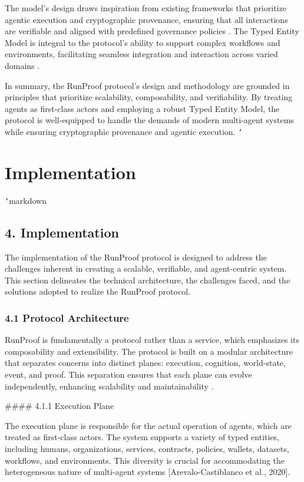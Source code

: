 \documentclass[11pt]{article}
\begin{document}
The model's design draws inspiration from existing frameworks that prioritize agentic execution and cryptographic provenance, ensuring that all interactions are verifiable and aligned with predefined governance policies \cite{Moslemi2026}. The Typed Entity Model is integral to the protocol's ability to support complex workflows and environments, facilitating seamless integration and interaction across varied domains \cite{Li2025}.

In summary, the RunProof protocol's design and methodology are grounded in principles that prioritize scalability, composability, and verifiability. By treating agents as first-class actors and employing a robust Typed Entity Model, the protocol is well-equipped to handle the demands of modern multi-agent systems while ensuring cryptographic provenance and agentic execution.
\texttt{`}


\section{Implementation}
\texttt{`}markdown
\subsection{4. Implementation}

The implementation of the RunProof protocol is designed to address the challenges inherent in creating a scalable, verifiable, and agent-centric system. This section delineates the technical architecture, the challenges faced, and the solutions adopted to realize the RunProof protocol.

\subsubsection{4.1 Protocol Architecture}

RunProof is fundamentally a protocol rather than a service, which emphasizes its composability and extensibility. The protocol is built on a modular architecture that separates concerns into distinct planes: execution, cognition, world-state, event, and proof. This separation ensures that each plane can evolve independently, enhancing scalability and maintainability \cite{Guezouri2010}.

\#\#\#\# 4.1.1 Execution Plane

The execution plane is responsible for the actual operation of agents, which are treated as first-class actors. The system supports a variety of typed entities, including humans, organizations, services, contracts, policies, wallets, datasets, workflows, and environments. This diversity is crucial for accommodating the heterogeneous nature of multi-agent systems [Arevalo-Castiblanco et al., 2020].
\end{document}
